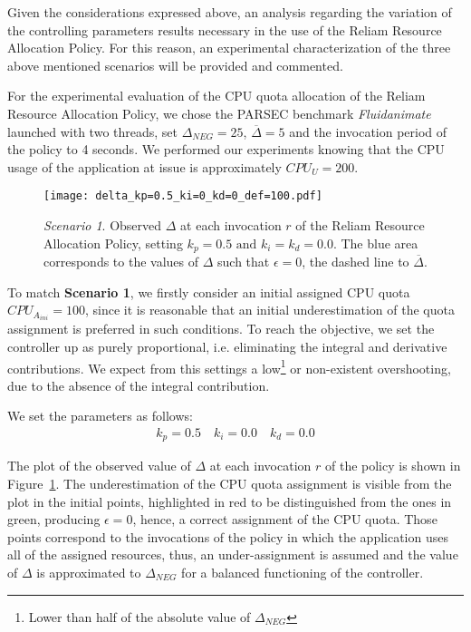 Given the considerations expressed above, an analysis regarding the variation of the controlling parameters results necessary in the use of the Reliam Resource Allocation Policy. For this reason, an experimental characterization of the three above mentioned scenarios will be provided and commented.

For the experimental evaluation of the CPU quota allocation of the Reliam Resource Allocation Policy, we chose the PARSEC benchmark \emph{Fluidanimate} launched with two threads, set $\Delta_{NEG}=25$, $\overline{\Delta}=5$ and the invocation period of the policy to 4 seconds. We performed our experiments knowing that the CPU usage of the application at issue is approximately $CPU_{U}= 200$.

\begin{figure}[t]
    \centering
    \texttt{[image: delta\_kp=0.5\_ki=0\_kd=0\_def=100.pdf]}
    \caption{\emph{Scenario 1}. Observed $\Delta$ at each invocation $r$ of the Reliam Resource Allocation Policy, setting $k_{p}=0.5\text{ and }k_{i}=k_{d}=0.0$. The blue area corresponds to the values of $\Delta$ such that $\epsilon=0$, the dashed line to $\overline{\Delta}$.}
    \label{fig:pid500}
\end{figure}

To match \textbf{Scenario 1}, we firstly consider an initial assigned CPU quota $CPU_{A_{ini}}=100$, since it is reasonable that an initial underestimation of the quota assignment is preferred in such conditions. To reach the objective, we set the controller up as purely proportional, i.e. eliminating the integral and derivative contributions. We expect from this settings a low\footnote{Lower than half of the absolute value of $\Delta_{NEG}$} or non-existent overshooting, due to the absence of the integral contribution.

We set the parameters as follows:
\begin{align*}
    k_p = 0.5 \quad k_i = 0.0 \quad k_d = 0.0
\end{align*}

The plot of the observed value of $\Delta$ at each invocation $r$ of the policy is shown in Figure~\ref{fig:pid500}. The underestimation of the CPU quota assignment is visible from the plot in the initial points, highlighted in red to be distinguished from the ones in green, producing $\epsilon=0$, hence, a correct assignment of the CPU quota. Those points correspond to the invocations of the policy in which the application uses all of the assigned resources, thus, an under-assignment is assumed and the value of $\Delta$ is approximated to $\Delta_{NEG}$ for a balanced functioning of the controller.

